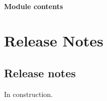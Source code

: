 \documentclass[a4paper,10pt,english]{sphinxmanual}
\begin{document}
\subsubsection{Module contents}
\label{\detokenize{apidoc_commands/commands:module-commands}}\label{\detokenize{apidoc_commands/commands:module-contents}}

\chapter{Release Notes}
\label{\detokenize{index:release-notes}}

\section{Release notes}
\label{\detokenize{release_notes/release_notes_5.0.0:release-notes}}\label{\detokenize{release_notes/release_notes_5.0.0::doc}}
In construction.
\end{document}
